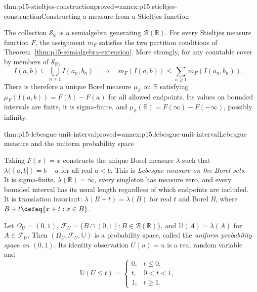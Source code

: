 \begin{hbtheorem}{thm:p15-stieltjes-construction}{proved=annex:p15.stieltjes-construction}{Constructing a measure from a Stieltjes function}
\par\nobreak
The collection \(\mathcal S_{\mathbb R}\) is a semialgebra generating
\(\mathcal B(\mathbb R)\). For every Stieltjes measure function \(F\),
the assignment \(m_F\) satisfies the two partition conditions of
Theorem~\ref{thm:p15-semialgebra-extension}. More strongly, for any
countable cover by members of \(\mathcal S_{\mathbb R}\),
\[
 I(a,b)\subseteq\bigcup_{n\geq1}I(a_n,b_n)
       \quad\Longrightarrow\quad
 m_F(I(a,b))\leq\sum_{n\geq1}m_F(I(a_n,b_n)).
\]
There is therefore a unique Borel measure \(\mu_F\) on
\(\mathbb R\) satisfying
\(\mu_F(I(a,b))=F(b)-F(a)\) for all allowed endpoints. Its values on
bounded intervals are finite, it is sigma-finite, and
\(\mu_F(\mathbb R)=F(\infty)-F(-\infty)\), possibly infinity.
\end{hbtheorem}

\begin{hbtheorem}{thm:p15-lebesgue-unit-interval}{proved=annex:p15.lebesgue-unit-interval}{Lebesgue measure and the uniform probability space}
\par\nobreak
Taking \(F(x)=x\) constructs the unique Borel measure \(\lambda\)
such that \(\lambda((a,b])=b-a\) for all real \(a<b\).
This is \emph{Lebesgue measure on the Borel sets}. It is sigma-finite,
\(\lambda(\mathbb R)=\infty\), every singleton has measure zero,
and every bounded interval has its usual length regardless of which
endpoints are included. It is translation invariant:
\(\lambda(B+t)=\lambda(B)\) for real \(t\) and Borel \(B\),
where \(B+t\defeq\{x+t:x\in B\}\).

Let \(\Omega_U=(0,1)\),
\(\mathcal F_U=\{B\cap(0,1):B\in\mathcal B(\mathbb R)\}\), and
\(\mathbb U(A)=\lambda(A)\) for \(A\in\mathcal F_U\).
Then \((\Omega_U,\mathcal F_U,\mathbb U)\) is a probability space,
called the \emph{uniform probability space on \((0,1)\)}. Its
identity observation \(U(u)=u\) is a real random variable and
\[
 \mathbb U(U\leq t)=
 \begin{cases}
 0,&t\leq0,\\
 t,&0<t<1,\\
 1,&t\geq1.
 \end{cases}
\]
\end{hbtheorem}

